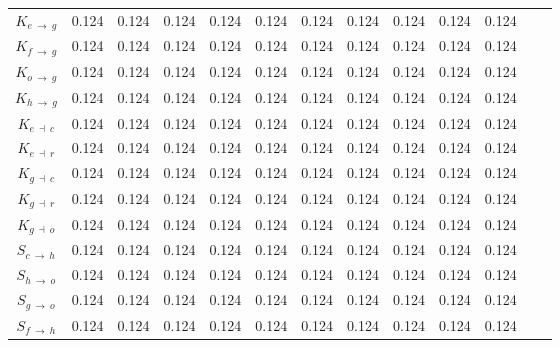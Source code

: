\begin{ThreePartTable}
\begin{longtable}{c l *{10}{c} c}
        $K_{e \: \rightarrow \: g}$ & 0.124 &  0.124 &  0.124 &  0.124 &  0.124 &  0.124 &  0.124 &  0.124 &  0.124 &  0.124 \\
        
        $K_{f \: \rightarrow \: g}$ & 0.124 &  0.124 &  0.124 &  0.124 &  0.124 &  0.124 &  0.124 &  0.124 &  0.124 &  0.124 \\
        
        $K_{o \: \rightarrow \: g}$ & 0.124 &  0.124 &  0.124 &  0.124 &  0.124 &  0.124 &  0.124 &  0.124 &  0.124 &  0.124 \\
        
        $K_{h \: \rightarrow \: g}$ & 0.124 &  0.124 &  0.124 &  0.124 &  0.124 &  0.124 &  0.124 &  0.124 &  0.124 &  0.124 \\
        
        $K_{e \: \dashv \: c}$ & 0.124 &  0.124 &  0.124 &  0.124 &  0.124 &  0.124 &  0.124 &  0.124 &  0.124 &  0.124 \\
        
        $K_{e \: \dashv \: r}$ & 0.124 &  0.124 &  0.124 &  0.124 &  0.124 &  0.124 &  0.124 &  0.124 &  0.124 &  0.124 \\
        
        $K_{g \: \dashv \: c}$ & 0.124 &  0.124 &  0.124 &  0.124 &  0.124 &  0.124 &  0.124 &  0.124 &  0.124 &  0.124 \\
        
        $K_{g \: \dashv \: r}$ & 0.124 &  0.124 &  0.124 &  0.124 &  0.124 &  0.124 &  0.124 &  0.124 &  0.124 &  0.124 \\
        
        $K_{g \: \dashv \: o}$ & 0.124 &  0.124 &  0.124 &  0.124 &  0.124 &  0.124 &  0.124 &  0.124 &  0.124 &  0.124 \\
        
        $S_{c \: \rightarrow \: h}$\tnote{f} & 0.124 &  0.124 &  0.124 &  0.124 &  0.124 &  0.124 &  0.124 &  0.124 &  0.124 &  0.124 \\
        
        $S_{h \: \rightarrow \: o}$ & 0.124 &  0.124 &  0.124 &  0.124 &  0.124 &  0.124 &  0.124 &  0.124 &  0.124 &  0.124 \\
        
        $S_{g \: \rightarrow \: o}$ & 0.124 &  0.124 &  0.124 &  0.124 &  0.124 &  0.124 &  0.124 &  0.124 &  0.124 &  0.124 \\
        
        $S_{f \: \rightarrow \: h}$ & 0.124 &  0.124 &  0.124 &  0.124 &  0.124 &  0.124 &  0.124 &  0.124 &  0.124 &  0.124 \\
        

\end{longtable}
\end{ThreePartTable}
